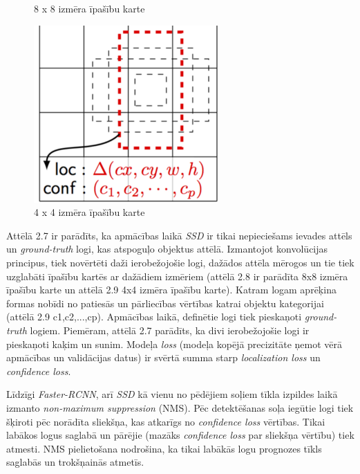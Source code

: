 \begin{figure}[!htb]
	\caption{8 x 8 izmēra īpašību karte \cite{liu2016ssd}}
	\endminipage\hfill
	\includegraphics[width=\linewidth]{images/ssd44featmap.png}
	\caption{4 x 4 izmēra īpašību karte \cite{liu2016ssd}}
	\endminipage
\end{figure}

Attēlā 2.7 ir parādīts, ka apmācības laikā \textit{SSD} ir tikai nepieciešams ievades attēls un \textit{ground-truth} logi, kas atspoguļo objektus attēlā. Izmantojot konvolūcijas principus, tiek novērtēti daži ierobežojošie logi, dažādos attēla mērogos un tie tiek uzglabāti īpašību kartēs ar dažādiem izmēriem (attēlā 2.8 ir parādīta 8x8 izmēra īpašību karte un attēlā 2.9 4x4 izmēra īpašību karte). Katram logam aprēķina formas nobīdi no patiesās un pārliecības vērtības katrai objektu kategorijai (attēlā 2.9 c1,c2,...,cp). Apmācības laikā, definētie logi tiek pieskaņoti \textit{ground-truth} logiem. Piemēram, attēlā 2.7 parādīts, ka divi ierobežojošie logi ir pieskaņoti kaķim un sunim. Modeļa \textit{loss} (modeļa kopējā precizitāte ņemot vērā apmācības un validācijas datus) ir svērtā summa starp \textit{localization loss} un \textit{confidence loss}. 

Līdzīgi \textit{Faster-RCNN}, arī \textit{SSD} kā vienu no pēdējiem soļiem tīkla izpildes laikā izmanto \textit{non-maximum suppression} (NMS). Pēc detektēšanas soļa iegūtie logi tiek šķiroti pēc norādīta sliekšņa, kas atkarīgs no \textit{confidence loss} vērtības. Tikai labākos logus saglabā un pārējie (mazāks \textit{confidence loss} par sliekšņa vērtību) tiek atmesti. NMS pielietošana nodrošina, ka tikai labākās logu prognozes tīkls saglabās un trokšņainās atmetīs.

